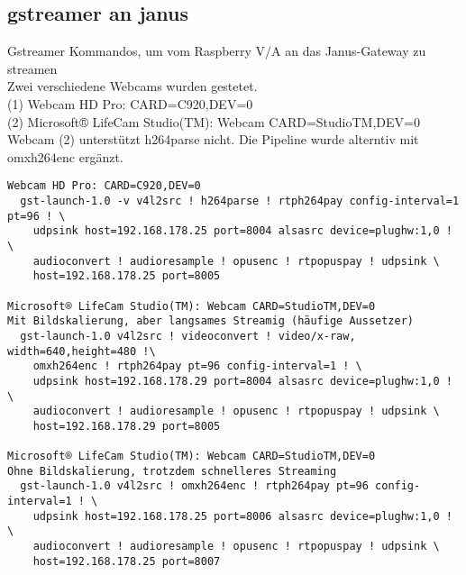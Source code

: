 \subsection{gstreamer an janus}
Gstreamer Kommandos, um vom Raspberry V/A an das Janus-Gateway zu streamen\\
Zwei verschiedene Webcams wurden gestetet. \\
(1) Webcam HD Pro: CARD=C920,DEV=0 \\
(2) Microsoft® LifeCam Studio(TM): Webcam CARD=StudioTM,DEV=0 \\
Webcam (2) unterstützt h264parse nicht. Die Pipeline wurde alterntiv mit 
omxh264enc ergänzt. 
\begin{verbatim}
Webcam HD Pro: CARD=C920,DEV=0
  gst-launch-1.0 -v v4l2src ! h264parse ! rtph264pay config-interval=1 pt=96 ! \
    udpsink host=192.168.178.25 port=8004 alsasrc device=plughw:1,0 ! \ 
    audioconvert ! audioresample ! opusenc ! rtpopuspay ! udpsink \ 
    host=192.168.178.25 port=8005
 
Microsoft® LifeCam Studio(TM): Webcam CARD=StudioTM,DEV=0
Mit Bildskalierung, aber langsames Streamig (häufige Aussetzer)
  gst-launch-1.0 v4l2src ! videoconvert ! video/x-raw, width=640,height=480 !\
    omxh264enc ! rtph264pay pt=96 config-interval=1 ! \ 
    udpsink host=192.168.178.29 port=8004 alsasrc device=plughw:1,0 ! \
    audioconvert ! audioresample ! opusenc ! rtpopuspay ! udpsink \
    host=192.168.178.29 port=8005 
   
Microsoft® LifeCam Studio(TM): Webcam CARD=StudioTM,DEV=0
Ohne Bildskalierung, trotzdem schnelleres Streaming
  gst-launch-1.0 v4l2src ! omxh264enc ! rtph264pay pt=96 config-interval=1 ! \ 
    udpsink host=192.168.178.25 port=8006 alsasrc device=plughw:1,0 ! \
    audioconvert ! audioresample ! opusenc ! rtpopuspay ! udpsink \
    host=192.168.178.25 port=8007 
\end{verbatim}

